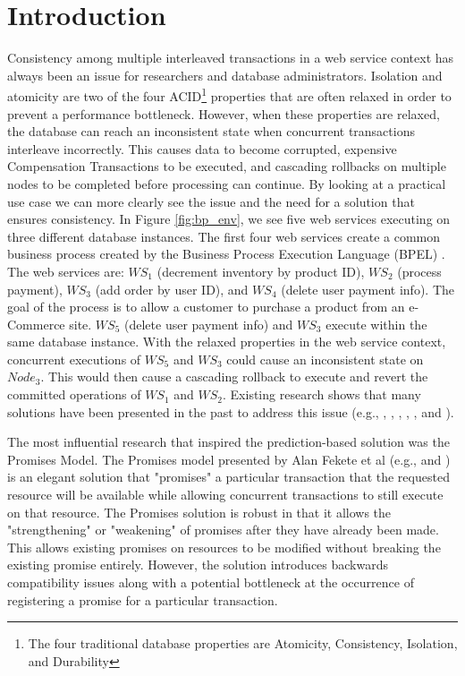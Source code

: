 \documentclass[conference]{IEEEtran}
\begin{document}
\section{Introduction}
Consistency among multiple interleaved transactions in a web service context has always been an issue for researchers and database administrators. Isolation and atomicity are two of the four ACID\footnote{The four traditional database properties are Atomicity, Consistency, Isolation, and Durability} properties that are often relaxed in order to prevent a performance bottleneck. However, when these properties are relaxed, the database can reach an inconsistent state when concurrent transactions interleave incorrectly. This causes data to become corrupted, expensive Compensation Transactions to be executed, and cascading rollbacks on multiple nodes to be completed before processing can continue. By looking at a practical use case we can more clearly see the issue and the need for a solution that ensures consistency. In Figure \ref{fig:bp_env}, we see five web services executing on three different database instances. The first four web services  create a common business process created by the Business Process Execution Language (BPEL) \cite{BPEL}. The web services are: $WS_{1}$ (decrement inventory by product ID), $WS_{2}$ (process payment), $WS_{3}$ (add order by user ID), and $WS_{4}$ (delete user payment info). The goal of the process is to allow a customer to purchase a product from an e-Commerce site. $WS_{5}$ (delete user payment info) and $WS_{3}$ execute within the same database instance. With the relaxed properties in the web service context, concurrent executions of $WS_{5}$ and $WS_{3}$ could cause an inconsistent state on $Node_{3}$. This would then cause a cascading rollback to execute and revert the committed operations of $WS_{1}$ and $WS_{2}$. Existing research shows that many solutions have been presented in the past to address this issue (e.g., \cite{Fekete_SnapshotIso}, \cite{Alrifai_Distributed_Managment}, \cite{Fekete_RAMP}, \cite{Fekete_IsolationSupport}, \cite{Jacobi_Locking}, and \cite{Fekete_Promises}). 

The most influential research that inspired the prediction-based solution was the Promises Model. The Promises model presented by Alan Fekete et al (e.g., \cite{Fekete_IsolationSupport} and \cite{Fekete_Promises}) is an elegant solution that "promises" a particular transaction that the requested resource will be available while allowing concurrent transactions to still execute on that resource. The Promises solution is robust in that it allows the "strengthening" or "weakening" of promises after they have already been made. This allows existing promises on resources to be modified without breaking the existing promise entirely. However, the solution introduces backwards compatibility issues along with a potential bottleneck at the occurrence of registering a promise for a particular transaction. 
\end{document}
